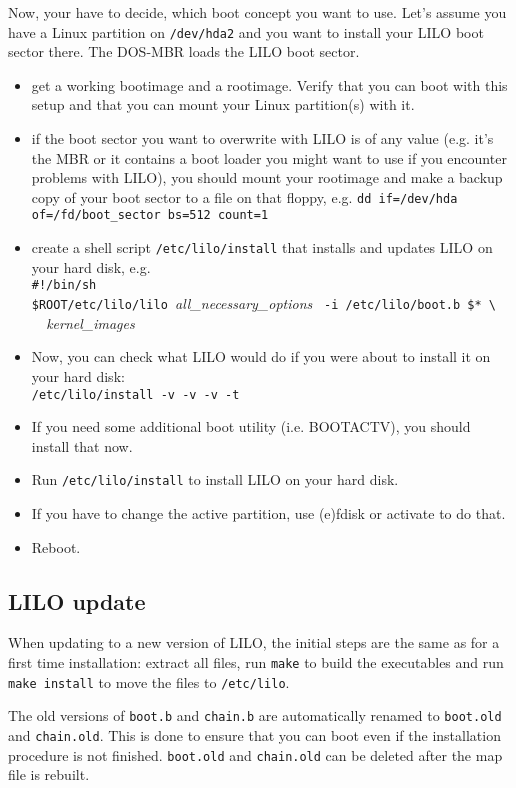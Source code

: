 Now, your have to decide, which boot concept you want to use. Let's assume
you have a Linux partition on {\tt /dev/hda2} and you want to install your
LILO boot sector there. The DOS-MBR loads the LILO boot sector.

\begin{itemize}
  \item get a working bootimage and a rootimage. Verify that you can boot
    with this setup and that you can mount your Linux partition(s) with it.
  \item if the boot sector you want to overwrite with LILO is of any value
    (e.g. it's the MBR or it contains a boot loader you might want to use
    if you encounter problems with LILO), you should mount your rootimage
    and make a backup copy of your boot sector to a file on that floppy,
    e.g. \verb"dd if=/dev/hda of=/fd/boot_sector bs=512 count=1"
  \item create a shell script {\tt /etc/lilo/install} that installs and
    updates LILO on your hard disk, e.g.\\
\verb"#!/bin/sh" \\
\verb"$ROOT/etc/lilo/lilo "{\it all\_necessary\_options\/}%
\verb" -i /etc/lilo/boot.b $* \" \\
\verb"  "{\it kernel\_images}
  \item Now, you can check what LILO would do if you were about to install
    it on your hard disk: \\
\verb"/etc/lilo/install -v -v -v -t"
  \item If you need some additional boot utility (i.e. BOOTACTV), you should
    install that now.
  \item Run {\tt /etc/lilo/install} to install LILO on your hard disk.
  \item If you have to change the active partition, use (e)fdisk or
    activate to do that.
  \item Reboot.
\end{itemize}


\subsection{LILO update}

When updating to a new version of LILO, the initial steps are the same as
for a first time installation: extract all files, run {\tt make} to build
the executables and run {\tt make install} to move the files to
{\tt /etc/lilo}.

The old versions of {\tt boot.b} and {\tt chain.b} are automatically
renamed to {\tt boot.old} and {\tt chain.old}. This is done to ensure
that you can boot even if the installation procedure is not finished.
{\tt boot.old} and {\tt chain.old} can be deleted after the map file
is rebuilt.

